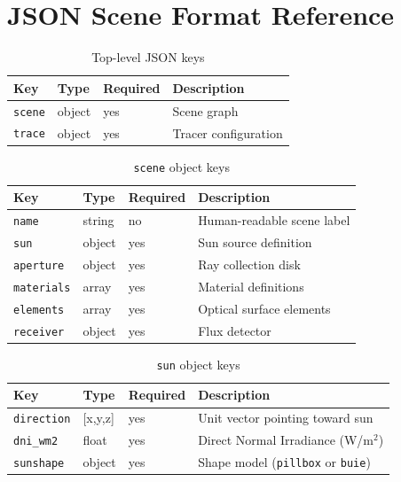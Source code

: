 \documentclass[12pt,a4paper]{report}
\begin{document}
\appendix
\chapter{JSON Scene Format Reference}

\begin{table}[H]\centering
\caption{Top-level JSON keys}
\begin{tabular}{llll}
\toprule
Key & Type & Required & Description \\
\midrule
\texttt{scene} & object & yes & Scene graph \\
\texttt{trace} & object & yes & Tracer configuration \\
\bottomrule
\end{tabular}
\end{table}

\begin{table}[H]\centering
\caption{\texttt{scene} object keys}
\begin{tabular}{llll}
\toprule
Key & Type & Required & Description \\
\midrule
\texttt{name}      & string & no  & Human-readable scene label \\
\texttt{sun}       & object & yes & Sun source definition \\
\texttt{aperture}  & object & yes & Ray collection disk \\
\texttt{materials} & array  & yes & Material definitions \\
\texttt{elements}  & array  & yes & Optical surface elements \\
\texttt{receiver}  & object & yes & Flux detector \\
\bottomrule
\end{tabular}
\end{table}

\begin{table}[H]\centering
\caption{\texttt{sun} object keys}
\begin{tabular}{llll}
\toprule
Key & Type & Required & Description \\
\midrule
\texttt{direction}  & [x,y,z] & yes & Unit vector pointing toward sun \\
\texttt{dni\_wm2}   & float   & yes & Direct Normal Irradiance (W/m$^2$) \\
\texttt{sunshape}   & object  & yes & Shape model (\texttt{pillbox} or \texttt{buie}) \\
\bottomrule
\end{tabular}
\end{table}
\end{document}
